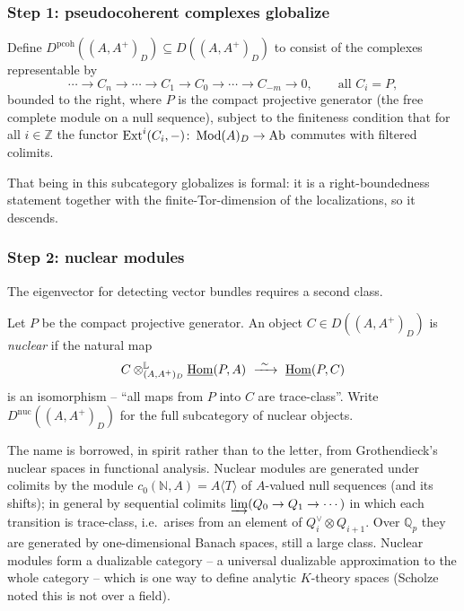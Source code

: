 \subsubsection*{Step 1: pseudocoherent complexes globalize}

\begin{definition}
\label{def:10:solid-pcoh}
Define $D^{\mathrm{pcoh}}((A,A^{+})_{D})\subseteq D((A,A^{+})_{D})$ to consist of
the complexes representable by
\begin{equation*}
\cdots\to C_{n}\to\cdots\to C_{1}\to C_{0}\to\cdots\to C_{-m}\to 0,\qquad
\text{all } C_{i}=P,
\end{equation*}
bounded to the right, where $P$ is the compact projective generator (the free
complete module on a null sequence), subject to the finiteness condition that for
all $i\in\mathbb{Z}$ the functor $\operatorname{Ext}^{i}(C_{i},-)\colon\operatorname{Mod}(A)_{D}\to\mathrm{Ab}$
commutes with filtered colimits.
\end{definition}

That being in this subcategory globalizes is formal: it is a right-boundedness
statement together with the finite-Tor-dimension of the localizations, so it
descends.

\subsubsection*{Step 2: nuclear modules}

The eigenvector for detecting vector bundles requires a second class.

\begin{definition}
\label{def:10:nuclear}
Let $P$ be the compact projective generator. An object
$C\in D((A,A^{+})_{D})$ is \emph{nuclear} if the natural map
\begin{equation}
\label{eq:10:nuclear}
C\otimes^{\mathbb{L}}_{(A,A^{+})_{D}}\underline{\operatorname{Hom}}(P,A)\
\xrightarrow{\ \sim\ }\ \underline{\operatorname{Hom}}(P,C)
\end{equation}
is an isomorphism -- ``all maps from $P$ into $C$ are trace-class''. Write
$D^{\mathrm{nuc}}((A,A^{+})_{D})$ for the full subcategory of nuclear objects.
\end{definition}

\begin{remark}
\label{rmk:10:nuclear-remarks}
The name is borrowed, in spirit rather than to the letter, from Grothendieck's
nuclear spaces in functional analysis. Nuclear modules are generated under
colimits by the module $c_{0}(\mathbb{N},A)=A\langle T\rangle$ of $A$-valued null
sequences (and its shifts); in general by sequential colimits
$\varinjlim(Q_{0}\to Q_{1}\to\cdots)$ in which each transition is trace-class,
i.e.\ arises from an element of $Q_{i}^{\vee}\otimes Q_{i+1}$. Over $\mathbb{Q}_p$
they are generated by one-dimensional Banach spaces, still a large class. Nuclear
modules form a dualizable category -- a universal dualizable approximation to the
whole category -- which is one way to define analytic $K$-theory spaces
(Scholze noted this is not over a field).
\end{remark}

